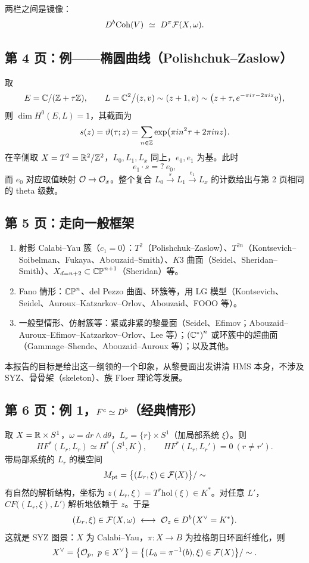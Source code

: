两栏之间是镜像：
\[
\db\Coh(V)\ \simeq\ D^\pi\FF(X,\omega).
\]

\subsection*{第 4 页：例——椭圆曲线（Polishchuk--Zaslow）}

取
\[
E=\mathbb{C}/(\mathbb{Z}+\tau\mathbb{Z}),\qquad
L=\mathbb{C}^2\big/(z,v)\sim(z+1,v)\sim\bigl(z+\tau,e^{-\pi i\tau-2\pi iz}v\bigr),
\]
则 $\dim H^0(E,L)=1$，其截面为
\[
s(z)=\vartheta(\tau;z)=\sum_{n\in\mathbb{Z}}\exp\bigl(\pi in^2\tau+2\pi inz\bigr).
\]
在辛侧取 $X=T^2=\mathbb{R}^2/\mathbb{Z}^2$，$L_0,L_1,L_x$ 同上，$e_0,e_1$ 为基。此时
\[
e_1\cdot s=?\ e_0,
\]
而 $e_0$ 对应取值映射 $\mathcal{O}\to\mathcal{O}_x$。整个复合 $L_0\xrightarrow{s}L_1\xrightarrow{e_1}L_x$ 的计数给出与第 2 页相同的 theta 级数。

\subsection*{第 5 页：走向一般框架}

\begin{enumerate}[label=\arabic*)]
  \item 射影 Calabi--Yau 簇（$c_1=0$）：$T^2$（Polishchuk--Zaslow）、$T^{2n}$（Kontsevich--Soibelman、Fukaya、Abouzaid--Smith）、$K3$ 曲面（Seidel、Sheridan--Smith）、$X_{d=n+2}\subset\mathbb{CP}^{n+1}$（Sheridan）等。
  \item Fano 情形：$\mathbb{CP}^n$、del Pezzo 曲面、环簇等，用 LG 模型（Kontsevich、Seidel、Auroux--Katzarkov--Orlov、Abouzaid、FOOO 等）。
  \item 一般型情形、仿射簇等：紧或非紧的黎曼面（Seidel、Efimov；Abouzaid--Auroux--Efimov--Katzarkov--Orlov、Lee 等）；$\left(\mathbb{C}^*\right)^n$ 或环簇中的超曲面（Gammage--Shende、Abouzaid--Auroux 等）；以及其他。
\end{enumerate}
本报告的目标是给出这一纲领的一个印象，从黎曼面出发讲清 HMS 本身，不涉及 SYZ、骨骨架（skeleton）、族 Floer 理论等发展。

\subsection*{第 6 页：例 1，$F^c\simeq D^{b}$（经典情形）}

取 $X=\mathbb{R}\times S^1$，$\omega=dr\wedge d\theta$，$L_r=\{r\}\times S^1$（加局部系统 $\xi$）。则
\[
HF^*(L_r,L_r)\simeq H^*(S^1,K),\qquad HF^*(L_r,L_r')=0\ (r\ne r').
\]
带局部系统的 $L_r$ 的模空间
\[
M_{\mathrm{pt}}=\bigl\{(L_r,\xi)\in\mathcal{F}(X)\bigr\}/\sim
\]
有自然的解析结构，坐标为 $z(L_r,\xi)=T^r\mathrm{hol}(\xi)\in K^*$。对任意 $L'$，$CF\bigl((L_r,\xi),L'\bigr)$ 解析地依赖于 $z$。于是
\[
(L_r,\xi)\in\FF(X,\omega)\ \longleftrightarrow\ \OO_z\in\db\bigl(X^\vee=K^*\bigr).
\]
这就是 SYZ 图景：$X$ 为 Calabi--Yau，$\pi\colon X\to B$ 为拉格朗日环面纤维化，则
\[
X^\vee=\bigl\{\mathcal{O}_p,\ p\in X^\vee\bigr\}=\bigl\{(L_b=\pi^{-1}(b),\xi)\in\mathcal{F}(X)\bigr\}/\sim .
\]

